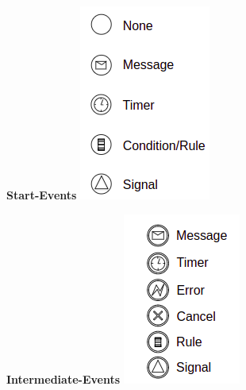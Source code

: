     \begin{minipage}[t]{0.3\textwidth}
    \centering
    \textbf{Start-Events}
    \newline
	\includegraphics[width=0.65\linewidth]{images/BPMN_start-event.png}
    \end{minipage}
    \begin{minipage}[t]{0.3\textwidth}
    \centering
    \textbf{Intermediate-Events}
    \newline
	\includegraphics[width=0.625\linewidth]{images/BPMN_intermediate-events.png}
    \end{minipage}

